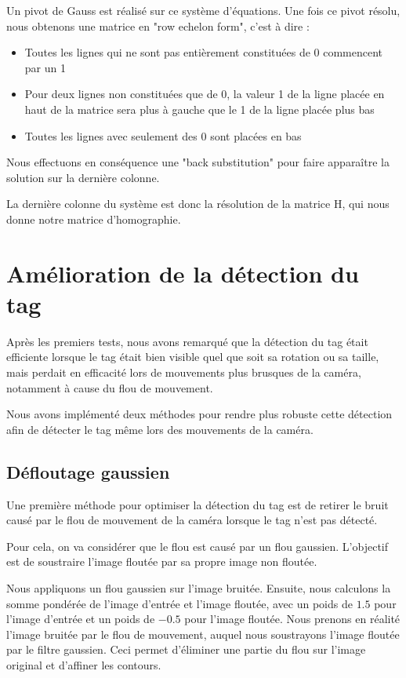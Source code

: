     Un pivot de Gauss est réalisé sur ce système d'équations. Une fois ce pivot résolu, nous obtenons une matrice en "row echelon form", c'est à dire :

    \begin{itemize}
        \item Toutes les lignes qui ne sont pas entièrement constituées de 0 commencent par un 1
        \item Pour deux lignes non constituées que de 0, la valeur 1 de la ligne placée en haut de la matrice sera plus à gauche que le 1 de la ligne placée plus bas
        \item Toutes les lignes avec seulement des 0 sont placées en bas
    \end{itemize}

    Nous effectuons en conséquence une "back substitution" pour faire apparaître la solution sur la dernière colonne.

    La dernière colonne du système est donc la résolution de la matrice H, qui nous donne notre matrice d'homographie.

    \section{Amélioration de la détection du tag}

    Après les premiers tests, nous avons remarqué que la détection du tag était efficiente lorsque le tag était bien visible quel que soit sa rotation ou sa taille, mais perdait en efficacité lors de mouvements plus brusques de la caméra, notamment à cause du flou de mouvement.

    Nous avons implémenté deux méthodes pour rendre plus robuste cette détection afin de détecter le tag même lors des mouvements de la caméra.

        \subsection{Défloutage gaussien}

        Une première méthode pour optimiser la détection du tag est de retirer le bruit causé par le flou de mouvement de la caméra lorsque le tag n'est pas détecté.

        Pour cela, on va considérer que le flou est causé par un flou gaussien. L'objectif est de soustraire l'image floutée par sa propre image non floutée.

        Nous appliquons un flou gaussien sur l'image bruitée. Ensuite, nous calculons la somme pondérée de l'image d'entrée et l'image floutée, avec un poids de $1.5$ pour l'image d'entrée et un poids de $-0.5$ pour l'image floutée. Nous prenons en réalité l'image bruitée par le flou de mouvement, auquel nous soustrayons l'image floutée par le filtre gaussien. Ceci permet d'éliminer une partie du flou sur l'image original et d'affiner les contours.

